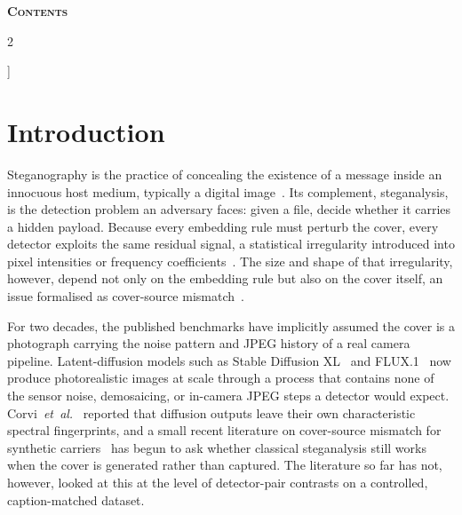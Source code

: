 \documentclass[10pt,twocolumn,a4paper]{article}
\makeatletter
\newcommand{\barecontents}{\@starttoc{toc}}
\DeclareRobustCommand{\by}[1]{\textnormal{\normalfont\footnotesize\space--- #1}}
\makeatother
\begin{document}
\begin{@twocolumnfalse}
\begin{center}
\begin{minipage}{0.86\textwidth}
\end{minipage}
\end{center}
\vspace{0.7cm}
{\centering\small\bfseries\scshape Contents\par}
\vspace{0.25cm}
{\small
\setlength{\columnsep}{2.2em}%
\begin{multicols}{2}
\setlength{\parskip}{3pt}%
\barecontents
\end{multicols}}
\vspace{0.3cm}
\end{@twocolumnfalse}
]
\clearpage

\section[Introduction\by{\textbf{Writer:} Nico Müller-Späth  \textbf{Reviewer:} David Wicker  \textbf{Contributor:}  Abdul Moiz Akbar}]{Introduction}
\label{sec:intro}

Steganography is the practice of concealing the existence of a message inside an innocuous host medium, typically a digital image~\cite{petitcolas1999,cheddad2010}. Its complement, steganalysis, is the detection problem an adversary faces: given a file, decide whether it carries a hidden payload. Because every embedding rule must perturb the cover, every detector exploits the same residual signal, a statistical irregularity introduced into pixel intensities or frequency coefficients~\cite{westfeld1999chi,fridrich2001lsb,dumitrescu2003sp}. The size and shape of that irregularity, however, depend not only on the embedding rule but also on the cover itself, an issue formalised as cover-source mismatch~\cite{giboulot2020csm,mallet2024csm}.

For two decades, the published benchmarks have implicitly assumed the cover is a photograph carrying the noise pattern and JPEG history of a real camera pipeline. Latent-diffusion models such as Stable Diffusion XL~\cite{sdxl2023} and FLUX.1~\cite{flux2024} now produce photorealistic images at scale through a process that contains none of the sensor noise, demosaicing, or in-camera JPEG steps a detector would expect. Corvi~\textit{et~al.}~\cite{corvi2023diffusion} reported that diffusion outputs leave their own characteristic spectral fingerprints, and a small recent literature on cover-source mismatch for synthetic carriers~\cite{mereur2024deepfake,mallet2024csm} has begun to ask whether classical steganalysis still works when the cover is generated rather than captured. The literature so far has not, however, looked at this at the level of detector-pair contrasts on a controlled, caption-matched dataset.
\end{document}

